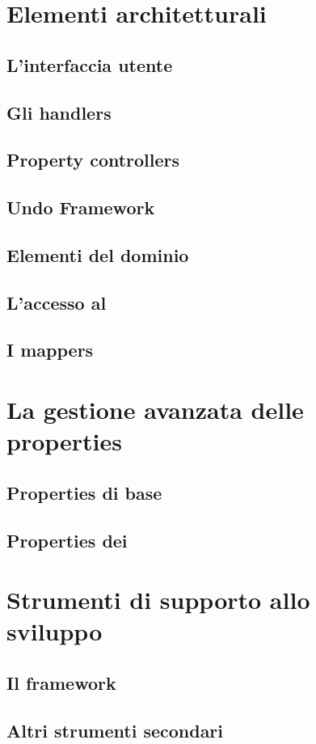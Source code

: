 \section{Elementi architetturali}

\subsection{L'interfaccia utente}


\subsection{Gli handlers}

\subsection{Property controllers}

\subsection{Undo Framework}

\subsection{Elementi del dominio}

\subsection{L'accesso al \fs{}}

\subsection{I mappers}

\section{La gestione avanzata delle properties}
\subsection{Properties di base}
\subsection{Properties dei \plugin{}}

\section{Strumenti di supporto allo sviluppo}
\subsection{Il framework \qt{}}
\subsection{Altri strumenti secondari}
